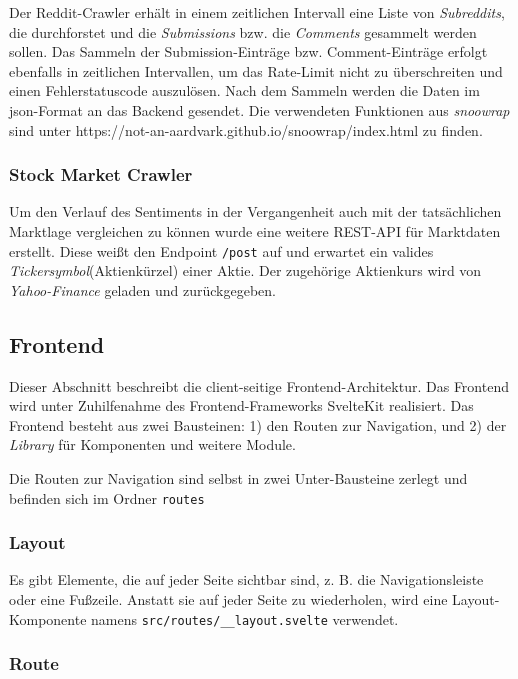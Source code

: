 \documentclass[a4paper, 10pt, conference]{IEEEtran}
\begin{document}
Der Reddit-Crawler erhält in einem zeitlichen Intervall eine Liste von \textit{Subreddits}, die durchforstet und die \textit{Submissions} bzw. die \textit{Comments} gesammelt werden sollen. Das Sammeln der Submission-Einträge bzw. Comment-Einträge erfolgt ebenfalls in zeitlichen Intervallen, um das Rate-Limit nicht zu überschreiten und einen Fehlerstatuscode auszulösen. Nach dem Sammeln werden die Daten im json-Format an das Backend gesendet. Die verwendeten Funktionen aus \textit{snoowrap} sind unter https://not-an-aardvark.github.io/snoowrap/index.html zu finden.

\subsubsection{Stock Market Crawler}

Um den Verlauf des Sentiments in der Vergangenheit auch mit der tatsächlichen Marktlage vergleichen zu können wurde eine weitere REST-API für Marktdaten erstellt. Diese weißt den Endpoint \texttt{/post} auf und erwartet ein valides \textit{Tickersymbol}(Aktienkürzel) einer Aktie. Der zugehörige Aktienkurs wird von \textit{Yahoo-Finance} geladen und zurückgegeben.

\subsection{Frontend} \label{sub:frontend}
Dieser Abschnitt beschreibt die client-seitige Frontend-Architektur. Das Frontend wird unter Zuhilfenahme des Frontend-Frameworks SvelteKit \cite{sveltekit} realisiert. Das Frontend besteht aus zwei Bausteinen: 1) den Routen zur Navigation, und 2) der \textit{Library} für Komponenten und weitere Module.

Die Routen zur Navigation sind selbst in zwei Unter-Bausteine zerlegt und befinden sich im Ordner \texttt{routes}

\subsubsection{Layout}

Es gibt Elemente, die auf jeder Seite sichtbar sind, z. B. die Navigationsleiste oder eine Fußzeile. Anstatt sie auf jeder Seite zu wiederholen,  wird eine Layout-Komponente namens \texttt{src/routes/\_\_layout.svelte} verwendet.

\subsubsection{Route}
\end{document}

